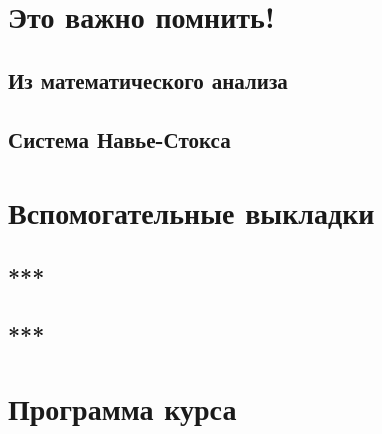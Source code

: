 
\LARGE



\section*{Это важно помнить!}

\subsection*{Из математического анализа}


\subsection*{Система Навье-Стокса}


\newpage
\section*{Вспомогательные выкладки}
\subsection*{***}

\subsection*{***}


\newpage
\section*{Программа курса}






